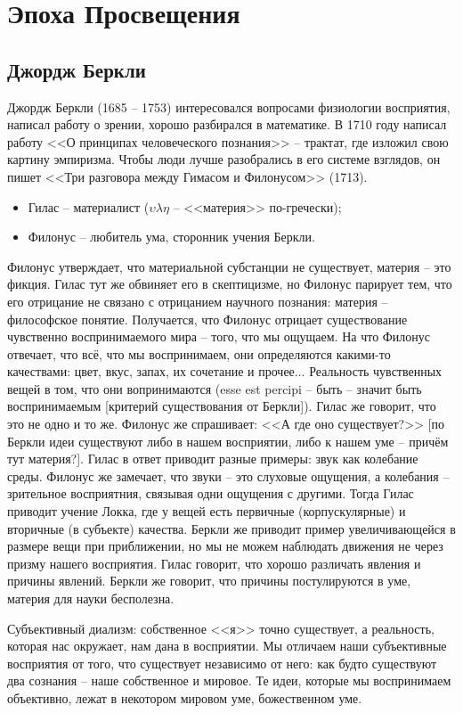 \documentclass[a4paper, 12pt]{book} %
\begin{document}
\section{Эпоха Просвещения}
\subsection{Джордж Беркли}
Джордж Беркли (1685 -- 1753) интересовался вопросами физиологии восприятия, написал работу о зрении, хорошо разбирался в математике.
В 1710 году написал работу <<О принципах человеческого познания>> -- трактат, где изложил свою картину эмпиризма. Чтобы люди лучше разобрались в его системе взглядов, он пишет <<Три разговора между Гимасом и Филонусом>> (1713).
\begin{itemize}
\item Гилас -- материалист ($\upsilon \lambda \eta$ -- <<материя>> по-гречески);
\item Филонус -- любитель ума, сторонник учения Беркли.
\end{itemize}
Филонус утверждает, что материальной субстанции не существует, материя -- это фикция.	Гилас тут же обвиняет его в скептицизме, но Филонус парирует тем, что его отрицание не связано с отрицанием научного познания: материя -- философское понятие. Получается, что Филонус отрицает существование чувственно воспринимаемого мира -- того, что мы ощущаем. На что Филонус отвечает, что всё, что мы воспринимаем, они определяются какими-то качествами: цвет, вкус, запах, их сочетание и прочее... Реальность чувственных вещей в том, что они вопринимаются (esse est percipi -- быть -- значит быть воспринимаемым [критерий существования от Беркли]). Гилас же говорит, что это не одно и то же. Филонус же спрашивает: <<А где оно существует?>> [по Беркли идеи существуют либо в нашем восприятии, либо  к нашем уме -- причём тут материя?]. Гилас в ответ приводит разные примеры: звук как колебание среды. Филонус же замечает, что звуки -- это слуховые ощущения, а колебания -- зрительное восприятния, связывая одни ощущения с другими. Тогда Гилас приводит учение Локка, где у вещей есть первичные (корпускулярные) и вторичные (в субъекте) качества. Беркли же приводит пример увеличивающейся в размере вещи при приближении, но мы не можем наблюдать движения не через призму нашего восприятия. Гилас говорит, что хорошо различать явления и причины явлений. Беркли же говорит, что причины постулируются в уме, материя для науки бесполезна.

Субъективный диализм: собственное <<я>> точно существует, а реальность, которая нас окружает, нам дана в восприятии. Мы отличаем наши субъективные восприятия от того, что существует независимо от него: как будто существуют два сознания -- наше собственное и мировое. Те идеи, которые мы воспринимаем объективно, лежат в некотором мировом уме, божественном уме.
\end{document}
